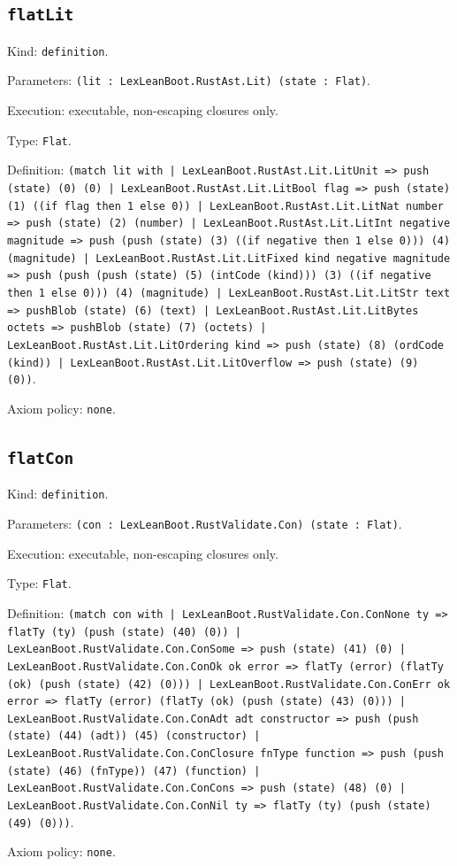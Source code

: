 \documentclass[11pt]{article}
\begin{document}
\subsection*{\texttt{flatLit}}
\noindent Kind: \texttt{definition}.\par
\noindent Parameters: \texttt{(lit : LexLeanBoot.RustAst.Lit) (state : Flat)}.\par
\noindent Execution: executable, non-escaping closures only.\par
\noindent Type: \texttt{Flat}.\par
\noindent Definition: \texttt{(match lit with | LexLeanBoot.RustAst.Lit.LitUnit => push (state) (0) (0) | LexLeanBoot.RustAst.Lit.LitBool flag => push (state) (1) ((if flag then 1 else 0)) | LexLeanBoot.RustAst.Lit.LitNat number => push (state) (2) (number) | LexLeanBoot.RustAst.Lit.LitInt negative magnitude => push (push (state) (3) ((if negative then 1 else 0))) (4) (magnitude) | LexLeanBoot.RustAst.Lit.LitFixed kind negative magnitude => push (push (push (state) (5) (intCode (kind))) (3) ((if negative then 1 else 0))) (4) (magnitude) | LexLeanBoot.RustAst.Lit.LitStr text => pushBlob (state) (6) (text) | LexLeanBoot.RustAst.Lit.LitBytes octets => pushBlob (state) (7) (octets) | LexLeanBoot.RustAst.Lit.LitOrdering kind => push (state) (8) (ordCode (kind)) | LexLeanBoot.RustAst.Lit.LitOverflow => push (state) (9) (0))}.\par
\noindent Axiom policy: \texttt{none}.\par
\subsection*{\texttt{flatCon}}
\noindent Kind: \texttt{definition}.\par
\noindent Parameters: \texttt{(con : LexLeanBoot.RustValidate.Con) (state : Flat)}.\par
\noindent Execution: executable, non-escaping closures only.\par
\noindent Type: \texttt{Flat}.\par
\noindent Definition: \texttt{(match con with | LexLeanBoot.RustValidate.Con.ConNone ty => flatTy (ty) (push (state) (40) (0)) | LexLeanBoot.RustValidate.Con.ConSome => push (state) (41) (0) | LexLeanBoot.RustValidate.Con.ConOk ok error => flatTy (error) (flatTy (ok) (push (state) (42) (0))) | LexLeanBoot.RustValidate.Con.ConErr ok error => flatTy (error) (flatTy (ok) (push (state) (43) (0))) | LexLeanBoot.RustValidate.Con.ConAdt adt constructor => push (push (state) (44) (adt)) (45) (constructor) | LexLeanBoot.RustValidate.Con.ConClosure fnType function => push (push (state) (46) (fnType)) (47) (function) | LexLeanBoot.RustValidate.Con.ConCons => push (state) (48) (0) | LexLeanBoot.RustValidate.Con.ConNil ty => flatTy (ty) (push (state) (49) (0)))}.\par
\noindent Axiom policy: \texttt{none}.\par
\end{document}
